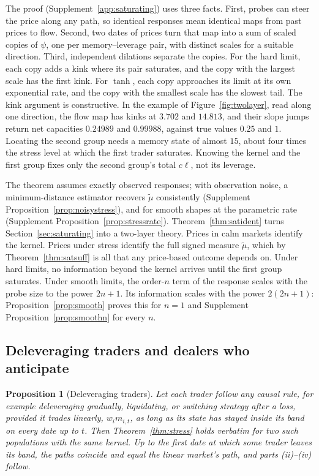 \documentclass[12pt]{article}
\newtheorem{proposition}[theorem]{Proposition}
\theoremstyle{definition}
\theoremstyle{remark}
\begin{document}
The proof (Supplement~\ref{app:saturating}) uses three facts. First, probes can steer the price along any path, so identical responses mean identical maps from past prices to flow. Second, two dates of prices turn that map into a sum of scaled copies of $\psi$, one per memory--leverage pair, with distinct scales for a suitable direction. Third, independent dilations separate the copies. For the hard limit, each copy adds a kink where its pair saturates, and the copy with the largest scale has the first kink. For $\tanh$, each copy approaches its limit at its own exponential rate, and the copy with the smallest scale has the slowest tail. The kink argument is constructive. In the example of Figure~\ref{fig:twolayer}, read along one direction, the flow map has kinks at $3.702$ and $14.813$, and their slope jumps return net capacities $0.24989$ and $0.99988$, against true values $0.25$ and $1$. Locating the second group needs a memory state of almost $15$, about four times the stress level at which the first trader saturates. Knowing the kernel and the first group fixes only the second group's total $c\ell$, not its leverage.

The theorem assumes exactly observed responses; with observation noise, a minimum-distance estimator recovers $\tilde\mu$ consistently (Supplement Proposition~\ref{prop:noisystress}), and for smooth shapes at the parametric rate (Supplement Proposition~\ref{prop:stressrate}). Theorem~\ref{thm:satident} turns Section~\ref{sec:saturating} into a two-layer theory. Prices in calm markets identify the kernel. Prices under stress identify the full signed measure $\tilde\mu$, which by Theorem~\ref{thm:satsuff} is all that any price-based outcome depends on. Under hard limits, no information beyond the kernel arrives until the first group saturates. Under smooth limits, the order-$n$ term of the response scales with the probe size to the power $2n+1$. Its information scales with the power $2(2n+1)$: Proposition~\ref{prop:smooth} proves this for $n=1$ and Supplement Proposition~\ref{prop:smoothn} for every $n$.

\subsection{Deleveraging traders and dealers who anticipate}

\begin{proposition}[Deleveraging traders]\label{prop:delever}
Let each trader follow any causal rule, for example deleveraging gradually, liquidating, or switching strategy after a loss, provided it trades linearly, $w_im_{i,t}$, as long as its state has stayed inside its band on every date up to $t$. Then Theorem~\ref{thm:stress} holds verbatim for two such populations with the same kernel. Up to the first date at which some trader leaves its band, the paths coincide and equal the linear market's path, and parts (ii)--(iv) follow.
\end{proposition}
\end{document}
